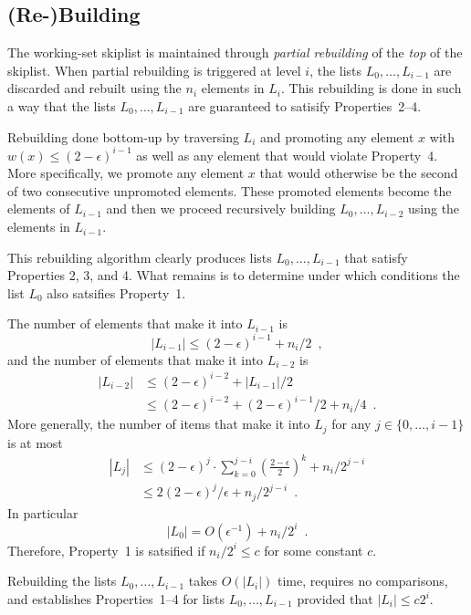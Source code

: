 \documentclass[lotsofwhite]{patmorin}
\begin{document}
\subsection{(Re-)Building}

The working-set skiplist is maintained through \emph{partial rebuilding} of the \emph{top} of the skiplist.  When partial rebuilding is triggered at level $i$, the lists $L_0,\ldots,L_{i-1}$ are discarded and rebuilt using the $n_i$ elements in $L_i$.  This rebuilding is done in such a way that the lists $L_0,\ldots,L_{i-1}$ are guaranteed to satisify Properties~2--4.

Rebuilding done bottom-up by traversing $L_i$ and promoting any element
$x$ with $w(x)\le (2-\epsilon)^{i-1}$ as well as any element that would
violate Property~4.  More specifically, we promote any element $x$ that
would otherwise be the second of two consecutive unpromoted elements.
These promoted elements become the elements of $L_{i-1}$ and then we
proceed recursively building $L_0,\ldots,L_{i-2}$ using the elements
in $L_{i-1}$.

This rebuilding algorithm clearly produces lists $L_0,\ldots,L_{i-1}$
that satisfy Properties 2, 3, and 4.  What remains is to determine under
which conditions the list $L_0$ also satsifies Property~1.

The number of elements that make it into $L_{i-1}$ is 
\[  |L_{i-1}| \le (2-\epsilon)^{i-1} + n_i/2 \enspace , \]
and the number of elements that make it into $L_{i-2}$ is
\begin{align*}
   |L_{i-2}| & \le (2-\epsilon)^{i-2} + |L_{i-1}|/2 \\
     & \le (2-\epsilon)^{i-2} + (2-\epsilon)^{i-1}/2 + n_i/4 \enspace . 
\end{align*}
More generally, the number of items that make it into $L_j$ for any $j\in \{0,\ldots,i-1\}$ is at most
\begin{align*}
    |L_j| & \le (2-\epsilon)^{j} \cdot \sum_{k=0}^{j-i}\left(\frac{2-\epsilon}{2}\right)^k  + n_i/2^{j-i} \\
       & \le 2(2-\epsilon)^j/\epsilon + n_j/2^{j-i} \enspace .
\end{align*}
In particular
\[
    |L_0| = O(\epsilon^{-1}) + n_i/2^i \enspace .
\]
Therefore, Property~1 is satsified if $n_i/2^i \le c$ for some constant $c$.

\begin{lem}
   Rebuilding the lists $L_0,\ldots,L_{i-1}$ takes $O(|L_i|)$ time,
   requires no comparisons, and establishes Properties~1--4 for lists
   $L_0,\ldots,L_{i-1}$ provided that $|L_i|\le c2^i$.
\end{lem}
\end{document}
